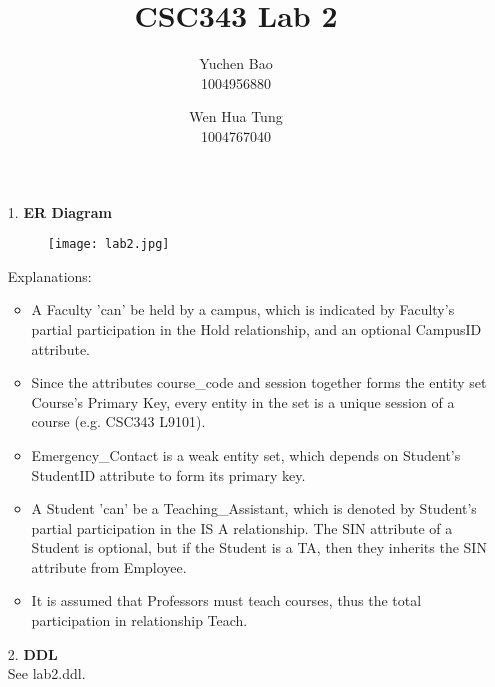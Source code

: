 \documentclass{article}
\title{\textbf{\huge{CSC343 Lab 2}}}
\date{}
\author{Yuchen Bao\\1004956880 \and Wen Hua Tung\\1004767040}
\begin{document}
\maketitle
\bigskip

\begin{enumerate}
    \item[1. ] \textbf{ER Diagram}\medskip\\
    \begin{figure}[htp]
    \centering
    \texttt{[image: lab2.jpg]}
    \end{figure}
    
    Explanations:
    \begin{itemize}
        \item A Faculty 'can' be held by a campus, which is indicated by Faculty's partial participation in the Hold relationship, and an optional CampusID attribute.
        \item Since the attributes course\_code and session together forms the entity set Course's Primary Key, every entity in the set is a unique session of a course (e.g. CSC343 L9101).
        \item Emergency\_Contact is a weak entity set, which depends on Student's StudentID attribute to form its primary key.
        \item A Student 'can' be a Teaching\_Assistant, which is denoted by Student's partial participation in the IS A relationship. The SIN attribute of a Student is optional, but if the Student is a TA, then they inherits the SIN attribute from Employee.
        \item It is assumed that Professors must teach courses, thus the total participation in relationship Teach.
    \end{itemize}
    
    \item[2. ] \textbf{DDL}\medskip\\
    See lab2.ddl.
\end{enumerate}
\end{document}
